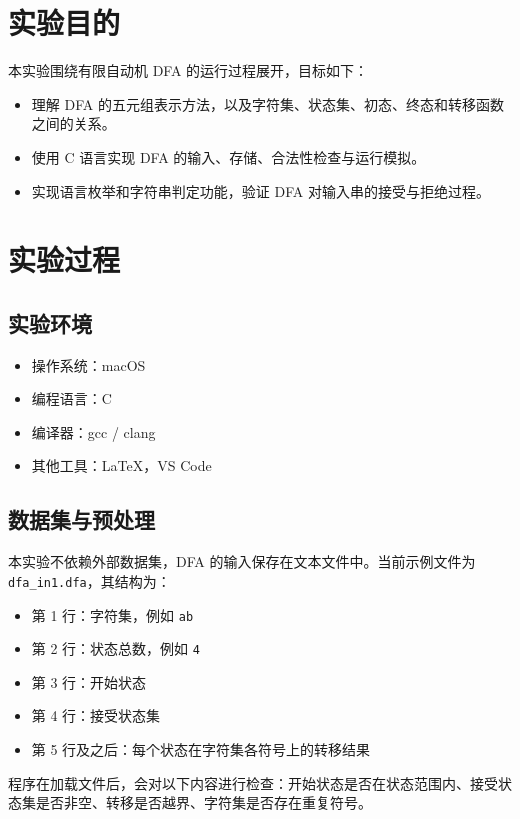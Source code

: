 \documentclass[12pt,a4paper]{ctexart}
\title{\reporttitle}
\author{\authname：\underline{\hspace{3cm}} \quad \authid：\underline{\hspace{3cm}}}
\date{\today}
\begin{document}
\maketitle

\section{实验目的}
本实验围绕有限自动机 DFA 的运行过程展开，目标如下：
\begin{itemize}
  \item 理解 DFA 的五元组表示方法，以及字符集、状态集、初态、终态和转移函数之间的关系。
  \item 使用 C 语言实现 DFA 的输入、存储、合法性检查与运行模拟。
  \item 实现语言枚举和字符串判定功能，验证 DFA 对输入串的接受与拒绝过程。
\end{itemize}

\section{实验过程}
\subsection{实验环境}
\begin{itemize}
  \item 操作系统：macOS
  \item 编程语言：C
  \item 编译器：gcc / clang
  \item 其他工具：LaTeX，VS Code
\end{itemize}

\subsection{数据集与预处理}
本实验不依赖外部数据集，DFA 的输入保存在文本文件中。当前示例文件为 \texttt{dfa\_in1.dfa}，其结构为：
\begin{itemize}
  \item 第 1 行：字符集，例如 \texttt{ab}
  \item 第 2 行：状态总数，例如 \texttt{4}
  \item 第 3 行：开始状态
  \item 第 4 行：接受状态集
  \item 第 5 行及之后：每个状态在字符集各符号上的转移结果
\end{itemize}

程序在加载文件后，会对以下内容进行检查：开始状态是否在状态范围内、接受状态集是否非空、转移是否越界、字符集是否存在重复符号。
\end{document}
